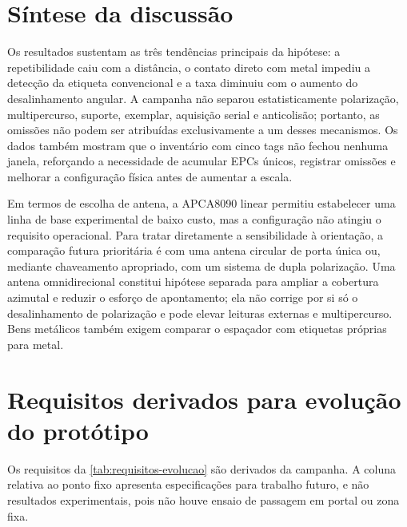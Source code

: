 \section{Síntese da discussão}

Os resultados sustentam as três tendências principais da hipótese: a repetibilidade caiu com a distância, o contato direto com metal impediu a detecção da etiqueta convencional e a taxa diminuiu com o aumento do desalinhamento angular. A campanha não separou estatisticamente polarização, multipercurso, suporte, exemplar, aquisição serial e anticolisão; portanto, as omissões não podem ser atribuídas exclusivamente a um desses mecanismos. Os dados também mostram que o inventário com cinco tags não fechou nenhuma janela, reforçando a necessidade de acumular EPCs únicos, registrar omissões e melhorar a configuração física antes de aumentar a escala.

Em termos de escolha de antena, a APCA8090 linear permitiu estabelecer uma linha de base experimental de baixo custo, mas a configuração não atingiu o requisito operacional. Para tratar diretamente a sensibilidade à orientação, a comparação futura prioritária é com uma antena circular de porta única ou, mediante chaveamento apropriado, com um sistema de dupla polarização. Uma antena omnidirecional constitui hipótese separada para ampliar a cobertura azimutal e reduzir o esforço de apontamento; ela não corrige por si só o desalinhamento de polarização e pode elevar leituras externas e multipercurso. Bens metálicos também exigem comparar o espaçador com etiquetas próprias para metal.

\section{Requisitos derivados para evolução do protótipo}

Os requisitos da \autoref{tab:requisitos-evolucao} são derivados da campanha. A coluna relativa ao ponto fixo apresenta especificações para trabalho futuro, e não resultados experimentais, pois não houve ensaio de passagem em portal ou zona fixa.

